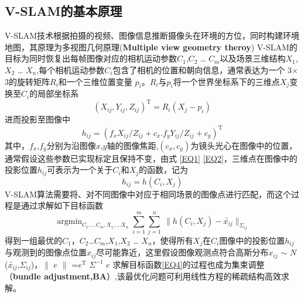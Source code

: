 \subsection{V-SLAM的基本原理}
V-SLAM技术根据拍摄的视频、图像信息推断摄像头在环境的方位，同时构建环境地图，其原理为多视图几何原理(\textbf{Multiple view geometry theroy}) V-SLAM的目标为同时恢复出每帧图像对应的相机运动参数$C_1$,$C_2$ … $C_m$以及场景三维结构$X_1$,$X_2$ … $X_n$,每个相机运动参数$C_i$包含了相机的位置和朝向信息，通常表达为一个 3$\times$3的旋转矩阵$R_i$和一个三维位置变量 $p_i$。$R_i$与$p_i$将一个世界坐标系下的三维点$X_j$变换至$C_i$的局部坐标系
\begin{equation}\label{EQ1}
{(X_{ij},Y_{ij},Z_{ij})}^\mathrm{T}=R_{i}(X_{j}-p_{i})
\end{equation}
进而投影至图像中
\begin{equation}\label{EQ2}
h_{ij}={(f_{x}X_{ij}/Z_{ij}+c_{x}.f_{y}Y_{ij}/Z_{ij}+c_{y})}^\mathrm{T}
\end{equation}
其中，$f_x$,$f_y$分别为沿图像$x$,$y$轴的图像焦距,$(c_x,c_y)$为镜头光心在图像中的位置，通常假设这些参数已实现标定且保持不变，由式
\eqref{EQ1} \eqref{EQ2}，三维点在图像中的投影位置$h_{ij}$可表示为一个关于$C_i$和$X_j$的函数，记为
\begin{equation}\label{EQ3}
h_{ij}=h(C_i,X_j)
\end{equation}
V-SLAM算法需要将、对不同图像中对应于相同场景的图像点进行匹配，而这个过程是通过求解如下目标函数
\begin{equation}\label{EQ4}
\mathop{\arg\min}_{C_1,…C_m,X_1,…X_n} \sum_{i=1}^{m} {\sum_{j=1}^{n} \ \| {h} (C_i,X_j)-\tilde{x_{ij}}\|_{\Sigma_{ij}}}
\end{equation}
得到一组最优的$C_1$，$C_2$…$C_m$,$X_1$,$X_2$ … $X_n$，使得所有$X_j$在$C_i$图像中的投影位置$h_{ij}$与观测到的图像点位置$x_{ij}$尽可能靠近，这里假设图像观测点符合高斯分布$x_{ij}$ $\sim$ $\mathrm{\textit{N}}$ ($\tilde{x_{ij}}$,$\Sigma_{ij}$)，$\|$ $e$ $\|$ =$e^{\mathrm{T}}$ $\Sigma^{-1}$ $e$
求解目标函数\eqref{EQ4}的过程也成为集束调整（\textbf{bundle adjustment,BA}）,该最优化问题可利用线性方程的稀疏结构高效求解。
